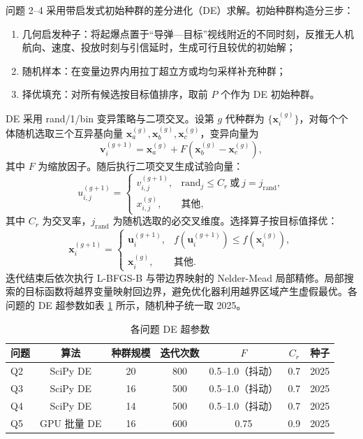 \documentclass[11pt,a4paper]{ctexart}
\begin{document}
问题 2--4 采用带启发式初始种群的差分进化（DE）求解。初始种群构造分三步：
\begin{enumerate}
  \item 几何启发种子：将起爆点置于“导弹—目标”视线附近的不同时刻，反推无人机航向、速度、投放时刻与引信延时，生成可行且较优的初始解；
  \item 随机样本：在变量边界内用拉丁超立方或均匀采样补充种群；
  \item 择优填充：对所有候选按目标值排序，取前 $P$ 个作为 DE 初始种群。
\end{enumerate}
DE 采用 rand/1/bin 变异策略与二项交叉。设第 $g$ 代种群为 $\{\bm{x}_i^{(g)}\}$，对每个个体随机选取三个互异基向量 $\bm{x}_a^{(g)},\bm{x}_b^{(g)},\bm{x}_c^{(g)}$，变异向量为
\begin{equation}
  \bm{v}_i^{(g+1)}=\bm{x}_a^{(g)}+F\left(\bm{x}_b^{(g)}-\bm{x}_c^{(g)}\right),
  \label{eq:mutation}
\end{equation}
其中 $F$ 为缩放因子。随后执行二项交叉生成试验向量：
\begin{equation}
  u_{i,j}^{(g+1)}=
  \begin{cases}
    v_{i,j}^{(g+1)}, & \mathrm{rand}_j\le C_r\ \text{或}\ j=j_{\mathrm{rand}},\\
    x_{i,j}^{(g)}, & \text{其他},
  \end{cases}
  \label{eq:crossover}
\end{equation}
其中 $C_r$ 为交叉率，$j_{\mathrm{rand}}$ 为随机选取的必交叉维度。选择算子按目标值择优：
\begin{equation}
  \bm{x}_i^{(g+1)}=
  \begin{cases}
    \bm{u}_i^{(g+1)}, & f\left(\bm{u}_i^{(g+1)}\right)\le f\left(\bm{x}_i^{(g)}\right),\\
    \bm{x}_i^{(g)}, & \text{其他}.
  \end{cases}
  \label{eq:selection}
\end{equation}
迭代结束后依次执行 L-BFGS-B 与带边界映射的 Nelder-Mead 局部精修。局部搜索的目标函数将越界变量映射回边界，避免优化器利用越界区域产生虚假最优。各问题的 DE 超参数如表 \ref{tab:de_params} 所示，随机种子统一取 2025。

\begin{table}[H]
\centering
\caption{各问题 DE 超参数}
\label{tab:de_params}
\small
\begin{tabular}{lcccccc}
\toprule
问题 & 算法 & 种群规模 & 迭代次数 & $F$ & $C_r$ & 种子 \\
\midrule
Q2 & SciPy DE & 20 & 800 & 0.5--1.0（抖动） & 0.7 & 2025 \\
Q3 & SciPy DE & 16 & 500 & 0.5--1.0（抖动） & 0.7 & 2025 \\
Q4 & SciPy DE & 14 & 500 & 0.5--1.0（抖动） & 0.7 & 2025 \\
Q5 & GPU 批量 DE & 16 & 600 & 0.75 & 0.9 & 2025 \\
\bottomrule
\end{tabular}
\end{table}
\end{document}
